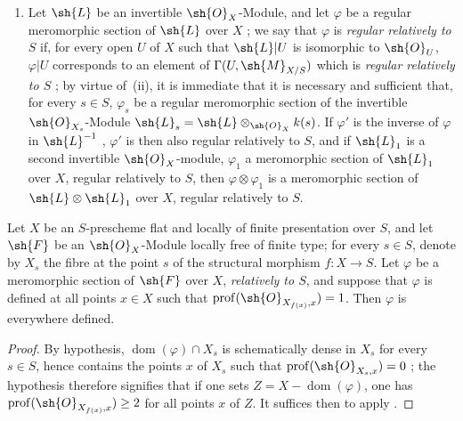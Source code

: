 \begin{remarks}[20.6.5]
\begin{enumerate}[label=(\roman*)]
  \item Let $\sh{L}$ be an invertible $\sh{O}_X$-Module, and let $\varphi$ be a regular meromorphic section of $\sh{L}$ over $X$ ;
  we say that $\varphi$ is \emph{regular relatively to $S$} if, for every open $U$ of $X$ such that $\sh{L}|U$ is isomorphic to $\sh{O}_U$, $\varphi|U$ corresponds to an element of $\Gamma(U,\sh{M}_{X/S})$ which is \emph{regular relatively to $S$} ;
  by virtue of~(ii), it is immediate that it is necessary and sufficient that, for every $s\in S$, $\varphi_s$ be a regular meromorphic section  of the invertible $\sh{O}_{X_s}$-Module $\sh{L}_s=\sh{L}\otimes_{\sh{O}_X}k(s)$.
  If $\varphi'$ is the inverse of $\varphi$ in $\sh{L}^{-1}$ , $\varphi'$ is then also regular relatively to $S$, and if $\sh{L}_1$ is a second invertible $\sh{O}_X$-module, $\varphi_1$ a meromorphic section of $\sh{L}_1$ over $X$, regular relatively to $S$, then $\varphi\otimes\varphi_1$ is a meromorphic section of $\sh{L}\otimes\sh{L}_1$ over $X$, regular relatively to $S$.
\end{enumerate}
\end{remarks}

\begin{proposition}[20.6.6]
\label{IV.20.6.6}
Let $X$ be an $S$-prescheme flat and locally of finite presentation over $S$, and let $\sh{F}$ be an $\sh{O}_X$-Module locally free of finite type;
for every $s\in S$, denote by $X_s$ the fibre at the point $s$ of the structural morphism $f:X\to S$.
Let $\varphi$ be a meromorphic section of $\sh{F}$ over $X$, \emph{relatively to $S$}, and suppose that $\varphi$ is defined at all points $x\in X$ such that $\operatorname{prof}(\sh{O}_{X_{f(x)},x})=1$.
Then $\varphi$ is everywhere defined.
\end{proposition}

\begin{proof}
By hypothesis, $\operatorname{dom}(\varphi)\cap X_s$ is schematically dense in $X_s$ for every $s\in S$, hence contains the points $x$ of $X_s$ such that $\operatorname{prof}(\sh{O}_{X_s,x})=0$ ;
the hypothesis therefore signifies that if one sets $Z=X-\operatorname{dom}(\varphi)$, one has $\operatorname{prof}(\sh{O}_{X_{f(x)},x})\geq 2$ for all points $x$ of $Z$.
It suffices then to apply .
\end{proof}

